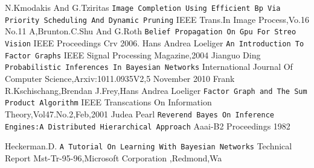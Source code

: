 \documentclass{raitdisser}
\begin{document}
\begin{thebibliography}{9}
N.Kmodakis And G.Tziritas
\texttt{Image Completion Using Efficient Bp Via Priority Scheduling And Dynamic Pruning}
IEEE Trans.In Image Process,Vo.16 No.11
A,Brunton.C.Shu And G.Roth
\texttt{Belief Propagation On Gpu For Streo Vision}
IEEE Proceedings Crv 2006.
Hans Andrea Loeliger
\texttt{An Introduction To Factor Graphs}
IEEE Signal Processing Magazine,2004
Jianguo Ding
\texttt{Probabilistic Inferences In Bayesian Networks}
International Journal Of Computer Science,Arxiv:1011.0935V2,5 November 2010
Frank R.Kschischang,Brendan J.Frey,Hans Andrea Loeliger
\texttt{Factor Graph and The Sum Product Algorithm}
IEEE Transcations On Information Theory,Vol47.No.2,Feb,2001
Judea Pearl
\texttt{Reverend Bayes On Inference Engines:A Distributed Hierarchical Approach}
Aaai-B2 Proceedings 1982

Heckerman.D.
\texttt{A Tutorial On Learning With Bayesian Networks}
Technical Report Mst-Tr-95-96,Microsoft Corporation ,Redmond,Wa

\end{thebibliography}

%
\end{document}
